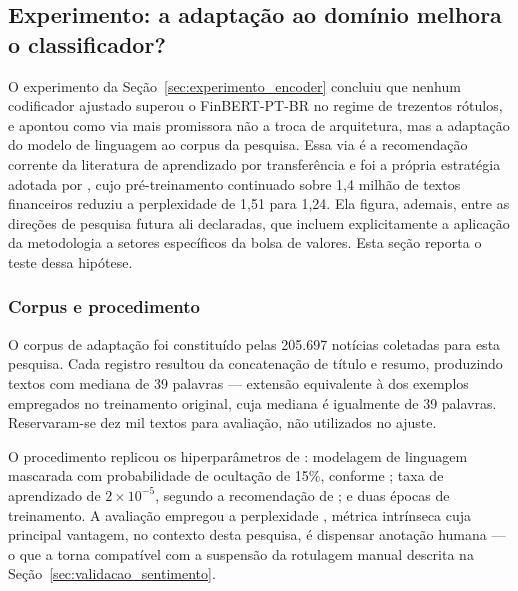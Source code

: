 \subsection{Experimento: a adaptação ao domínio melhora o classificador?}
\label{sec:adaptacao_dominio}

O experimento da Seção~\ref{sec:experimento_encoder} concluiu que nenhum codificador ajustado
superou o \mbox{FinBERT-PT-BR} no regime de trezentos rótulos, e apontou como via mais promissora
não a troca de arquitetura, mas a adaptação do modelo de linguagem ao corpus da pesquisa. Essa via
é a recomendação corrente da literatura de aprendizado por transferência
\cite{gururangan_dont_2020} e foi a própria estratégia adotada por ,
cujo pré-treinamento continuado sobre 1,4 milhão de textos financeiros reduziu a perplexidade de
1,51 para 1,24. Ela figura, ademais, entre as direções de pesquisa futura ali declaradas, que
incluem explicitamente a aplicação da metodologia a setores específicos da bolsa de valores. Esta
seção reporta o teste dessa hipótese.

\subsubsection{Corpus e procedimento}

O corpus de adaptação foi constituído pelas 205.697 notícias coletadas para esta pesquisa. Cada
registro resultou da concatenação de título e resumo, produzindo textos com mediana de 39 palavras
--- extensão equivalente à dos exemplos empregados no treinamento original, cuja mediana é
igualmente de 39 palavras. Reservaram-se dez mil textos para avaliação, não utilizados no ajuste.

O procedimento replicou os hiperparâmetros de : modelagem de
linguagem mascarada com probabilidade de ocultação de 15\%, conforme
; taxa de aprendizado de $2 \times 10^{-5}$, segundo a recomendação
de ; e duas épocas de treinamento. A avaliação empregou a perplexidade
\cite{chen_evaluation_1998}, métrica intrínseca cuja principal vantagem, no contexto desta
pesquisa, é dispensar anotação humana --- o que a torna compatível com a suspensão da rotulagem
manual descrita na Seção~\ref{sec:validacao_sentimento}.


